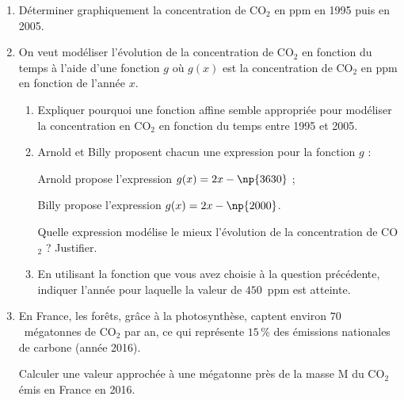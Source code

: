 \begin{enumerate}
\item Déterminer graphiquement la concentration de CO$_2$ en ppm en 1995 puis en 2005.


\item On veut modéliser l'évolution de la concentration de CO$_2$ en fonction du temps à l'aide d'une
fonction $g$ où $g(x)$ est la concentration de CO$_2$ en ppm en fonction de l'année $x$.
	\begin{enumerate}
		\item Expliquer pourquoi une fonction affine semble appropriée pour modéliser la concentration
en CO$_2$ en fonction du temps entre 1995 et 2005.

		\item  Arnold et Billy proposent chacun une expression pour la fonction $g$ :
		
Arnold propose l'expression $g(x) = 2x - \np{3630}$ ;
		
Billy propose l'expression $g(x) = 2x - \np{2000}$.
		
Quelle expression modélise le mieux l'évolution de la concentration de CO$_2$ ? Justifier.

		\item  En utilisant la fonction que vous avez choisie à la question précédente, indiquer l'année pour laquelle la valeur de $450$~ppm est atteinte.
		
 	\end{enumerate}
\item  En France, les forêts, grâce à la photosynthèse, captent environ $70$~mégatonnes de CO$_2$ par an, ce qui représente $15$\,\% des émissions nationales de carbone (année 2016).
	
Calculer une valeur approchée à une mégatonne près de la masse M du CO$_2$ émis en France en 2016.

\end{enumerate}

\bigskip

